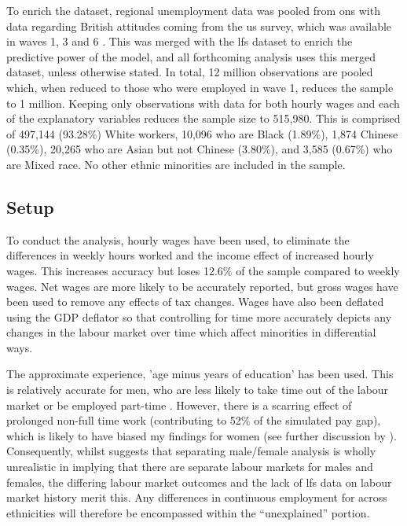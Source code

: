 \documentclass[class=article, crop=false]{standalone}
\begin{document}
To enrich the dataset, regional unemployment data was pooled from \acrlong{ons} \citep{ONSf} with data regarding British attitudes coming from the \acrfull{us} survey, which was available in waves 1, 3 and 6 \citep{US}. This was merged with the \acrshort{lfs} dataset to enrich the predictive power of the model, and all forthcoming analysis uses this merged dataset, unless otherwise stated. In total, 12 million observations are pooled which, when reduced to those who were employed in wave 1, reduces the sample to 1 million. Keeping only observations with data for both hourly wages and each of the explanatory variables reduces the sample size to 515,980. This is comprised of 497,144 (93.28\%) White workers, 10,096 who are Black (1.89\%), 1,874 Chinese (0.35\%), 20,265 who are  Asian but not Chinese (3.80\%), and 3,585 (0.67\%) who are Mixed race. No other ethnic minorities are included in the sample.

\subsection{Setup}
\label{sec:Setup}
To conduct the analysis, hourly wages have been used, to eliminate the differences in weekly hours worked and the income effect of increased hourly wages. This increases accuracy but loses 12.6\% of the sample compared to weekly wages. Net wages are more likely to be accurately reported, but gross wages have been used to remove any effects of tax changes. Wages have also been deflated using the GDP deflator \citep{ONSh} so that controlling for time more accurately depicts any changes in the labour market over time which affect minorities in differential ways. 

The approximate experience, 'age minus years of education' has been used. This is relatively accurate for men, who are less likely to take time out of the labour market or be employed part-time \citep{Olsen}. However, there is a scarring effect of prolonged non-full time work (contributing to 52\% of the simulated pay gap), which is likely to have biased my findings for women (see further discussion by \citet{Walby}). Consequently, whilst \citet{Olsen} suggests that separating male/female analysis is wholly unrealistic in implying that there are separate labour markets for males and females, the differing labour market outcomes \citep{GOVa} and the lack of \acrshort{lfs} data on labour market history merit this. Any differences in continuous employment for across ethnicities will therefore be encompassed within the \enquote{unexplained} portion.
\end{document}
